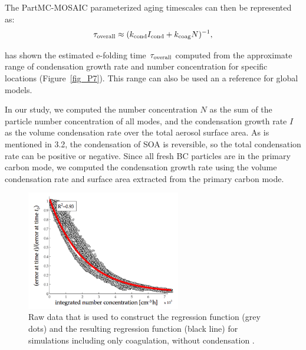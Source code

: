 \documentclass[12pt, fullpage]{uiucthesis2009}
\begin{document}
	The PartMC-MOSAIC parameterized aging timescales can then be represented as:
	\begin{align}
	\tau_{\rm overall} \approx (k_{\rm cond}I_{\rm cond} + k_{\rm coag}N)^{-1},
	\end{align}
	
	\citet{Fierce2016} has shown the estimated e-folding time $\tau_{\rm overall}$ computed from the approximate range of condensation growth rate and number concentration for specific locations (Figure~\ref{fig_P7}). This range can also be used an a reference for global models. 
	
	In our study, we computed the number concentration $N$ as the sum of the particle number concentration of all modes, and the condensation growth rate $I$ as the volume condensation rate over the total aerosol surface area. As is mentioned in 3.2, the condensation of SOA is reversible, so the total condensation rate can be positive or negative. Since all fresh BC particles are in the primary carbon mode, we computed the condensation growth rate using the volume condensation rate and surface area extracted from the primary carbon mode. 
	
	\begin{figure}[h] 
		\begin{center}
			\includegraphics[width = 0.6\textwidth]{Figure02}
			\caption[Raw data that is used to construct the regression function (grey dots) and the resulting regression function (black line) for simulations including only coagulation, without condensation \citep{Fierce2016}]{\label{fig_P2}Raw data that is used to construct the regression function (grey dots) and the resulting regression function (black line) for simulations including only coagulation, without condensation \citep{Fierce2016}.}
		\end{center}
	\end{figure}
	
\end{document}
